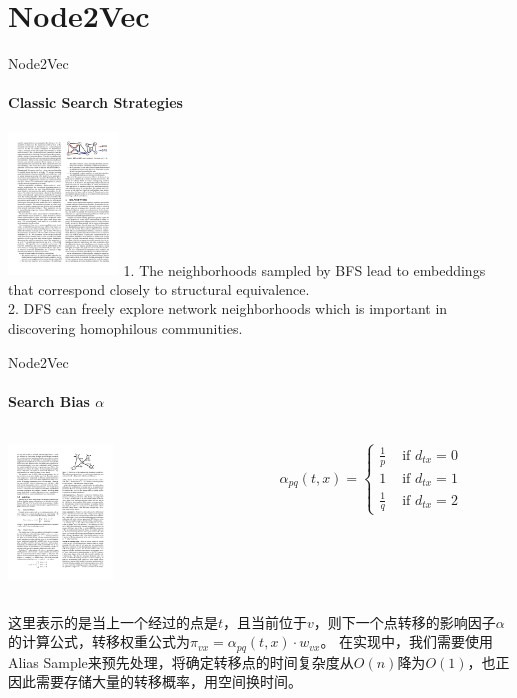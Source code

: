 \documentclass{beamer}
\begin{document}
\section{Node2Vec}
\begin{frame}{Node2Vec}
    \framesubtitle{Classic Search Strategies}
    \centering\includegraphics[height=3.8cm]{node2vec_1.pdf}
    1. The neighborhoods sampled by BFS lead to embeddings that correspond closely to structural equivalence.\\
    2. DFS can freely explore network neighborhoods which is important in discovering homophilous communities.
\end{frame}
\begin{frame}{Node2Vec}
    \framesubtitle{Search Bias $\alpha$ }
    \begin{columns}
        \begin{column}{0.5\textwidth}
            \centering\includegraphics[height=3.6cm]{node2vec_2.pdf}
        \end{column}
        \begin{column}{0.5\textwidth}
            $$
            \alpha_{p q}(t, x)= \begin{cases}\frac{1}{p} & \text { if } d_{t x}=0 \\ 1 & \text { if } d_{t x}=1 \\ \frac{1}{q} & \text { if } d_{t x}=2\end{cases}
            $$
        \end{column}
    \end{columns}
    这里表示的是当上一个经过的点是$t$，且当前位于$v$，则下一个点转移的影响因子$\alpha $的计算公式，转移权重公式为$\pi_{v x}=\alpha_{p q}(t, x) \cdot w_{v x}$。
    在实现中，我们需要使用Alias Sample来预先处理，将确定转移点的时间复杂度从$O(n)$降为$O(1)$，也正因此需要存储大量的转移概率，用空间换时间。
\end{frame}
\end{document}
